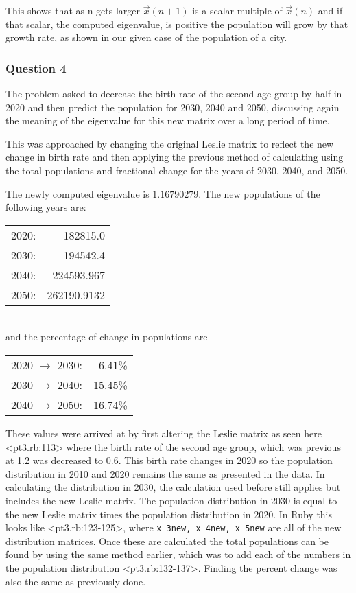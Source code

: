 \documentclass[letterpaper,11pt]{article}
\begin{document}
This shows that as n gets larger $\vec{x}(n+1)$ is a scalar multiple of $\vec{x}(n)$ and if that scalar,
the computed eigenvalue, is positive the population will grow by that growth rate,
as shown in our given case of the population of a city.

\subsubsection{Question 4}

The problem asked to decrease the birth rate of the second age group by half in 2020
and then predict the population for 2030, 2040 and 2050, discussing again the meaning
of the eigenvalue for this new matrix over a long period of time.

This was approached by changing the original Leslie matrix to reflect the new change
in birth rate and then applying the previous method of calculating using the total populations
and fractional change for the years of 2030, 2040, and 2050. 

The newly computed eigenvalue is $1.16790279$. The new populations of the following years are:

\begin{tabular}{l r}
2020: & 182815.0 \\
2030: & 194542.4 \\
2040: & 224593.967 \\
2050: & 262190.9132
\end{tabular}
\\

and the percentage of change in populations are

\begin{tabular}{l r}
2020 $\to$ 2030: & 6.41\% \\
2030 $\to$ 2040: & 15.45\% \\
2040 $\to$ 2050: & 16.74\%
\end{tabular}

These values were arrived at by first altering the Leslie matrix as seen here <pt3.rb:113> where
the birth rate of the second age group, which was previous at 1.2 was decreased to 0.6.
This birth rate changes in 2020 so the population distribution in 2010 and 2020 remains the same as
presented in the data.
In calculating the distribution in 2030, the calculation used before still applies but includes the
new Leslie matrix.
The population distribution in 2030 is equal to the new Leslie matrix times the population
distribution in 2020.
In Ruby this looks like <pt3.rb:123-125>, where \texttt{x\_3new, x\_4new, x\_5new} are all of the new
distribution matrices.
Once these are calculated the total populations can be found by using the same method earlier,
which was to add each of the numbers in the population distribution <pt3.rb:132-137>.
Finding the percent change was also the same as previously done. 
\end{document}
